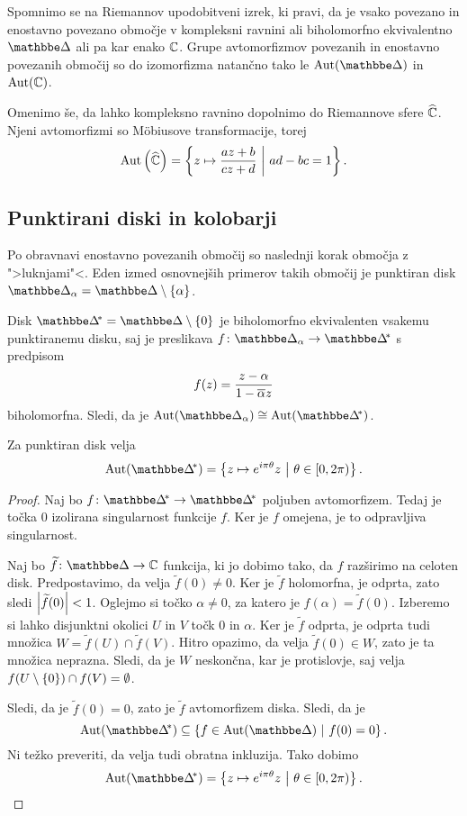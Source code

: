 Spomnimo se na Riemannov upodobitveni izrek, ki pravi, da je
vsako povezano in enostavno povezano območje v kompleksni ravnini
ali biholomorfno ekvivalentno $\dsk$ ali pa kar enako $\mathbb{C}$. Grupe
avtomorfizmov povezanih in enostavno povezanih območij so do
izomorfizma natančno tako le $\Aut(\dsk)$ in $\operatorname{Aut}(\mathbb{C})$.

Omenimo še, da lahko kompleksno ravnino dopolnimo do Riemannove
sfere $\widehat{\mathbb{C}}$. Njeni avtomorfizmi so Möbiusove transformacije, torej
\[
\operatorname{Aut} \left(\widehat{\mathbb{C}}\right) =
\left\{z \mapsto \frac{az + b}{cz + d}~\middle\vert~ad - bc = 1\right\}.
\]

\subsection{Punktirani diski in kolobarji}

Po obravnavi enostavno povezanih območij so naslednji korak
območja z ">luknjami"<. Eden izmed osnovnejših primerov takih
območij je punktiran disk
$\dsk_\alpha = \dsk \setminus \set{\alpha}$.

Disk $\dskx = \dsk \setminus \set{0}$ je biholomorfno
ekvivalenten vsakemu punktiranemu disku, saj je preslikava
$f \colon \dsk_\alpha \to \dskx$ s predpisom
\[
f(z) = \frac{z - \alpha}{1 - \overline{\alpha} z}
\]
biholomorfna. Sledi, da je
$\Aut(\dsk_\alpha) \cong \Aut(\dskx)$.

\begin{trditev}
Za punktiran disk velja
\[
\Aut(\dskx) =
\setb{z \mapsto e^{i \pi \theta} z}{\theta \in [0, 2\pi)}.
\]
\end{trditev}

\begin{proof}
Naj bo $f \colon \dskx \to \dskx$ poljuben avtomorfizem. Tedaj je
točka $0$ izolirana singularnost funkcije $f$. Ker je $f$ omejena,
je to odpravljiva singularnost.

Naj bo $\widetilde{f} \colon \dsk \to \C$ funkcija, ki jo dobimo
tako, da $f$ razširimo na celoten disk. Predpostavimo, da velja
$\widetilde{f}(0) \ne 0$. Ker je $\widetilde{f}$ holomorfna, je
odprta, zato sledi $\left\lvert \widetilde{f}(0)\right\rvert < 1$. Oglejmo si točko
$\alpha \ne 0$, za katero je $f(\alpha) = \widetilde{f}(0)$.
Izberemo si lahko disjunktni okolici $U$ in $V$ točk $0$ in
$\alpha$. Ker je $\widetilde{f}$ odprta, je odprta tudi množica
$W = \widetilde{f}(U) \cap \widetilde{f}(V)$. Hitro opazimo, da
velja $\widetilde{f}(0) \in W$, zato je ta množica neprazna.
Sledi, da je $W$ neskončna, kar je protislovje, saj velja
$f(U \setminus \left\{0\right\}) \cap f(V) = \emptyset$.

Sledi, da je $\widetilde{f}(0) = 0$, zato je $\widetilde{f}$
avtomorfizem diska. Sledi, da je
\[
\Aut(\dskx) \subseteq \setb{f \in \Aut(\dsk)}{f(0) = 0}.
\]
Ni težko preveriti, da velja tudi obratna inkluzija. Tako dobimo
\[
\Aut(\dskx) =
\setb{z \mapsto e^{i \pi \theta} z}{\theta \in [0, 2\pi)}.
\qedhere
\]
\end{proof}

